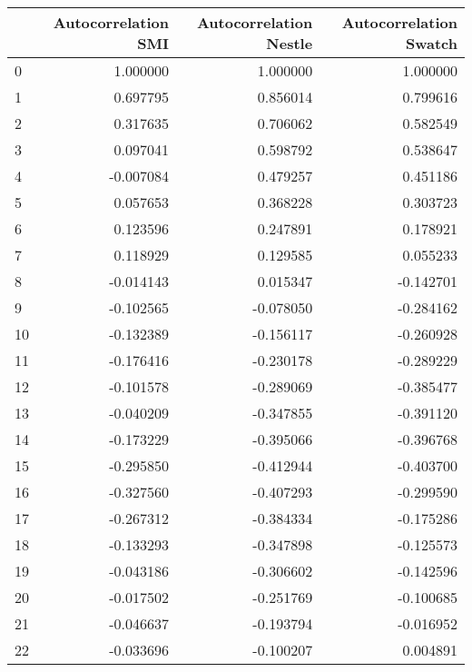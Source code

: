 \begin{tabular}{lrrr}
\toprule
{} &  Autocorrelation SMI &  Autocorrelation Nestle &  Autocorrelation Swatch \\
\midrule
0  &             1.000000 &                1.000000 &                1.000000 \\
1  &             0.697795 &                0.856014 &                0.799616 \\
2  &             0.317635 &                0.706062 &                0.582549 \\
3  &             0.097041 &                0.598792 &                0.538647 \\
4  &            -0.007084 &                0.479257 &                0.451186 \\
5  &             0.057653 &                0.368228 &                0.303723 \\
6  &             0.123596 &                0.247891 &                0.178921 \\
7  &             0.118929 &                0.129585 &                0.055233 \\
8  &            -0.014143 &                0.015347 &               -0.142701 \\
9  &            -0.102565 &               -0.078050 &               -0.284162 \\
10 &            -0.132389 &               -0.156117 &               -0.260928 \\
11 &            -0.176416 &               -0.230178 &               -0.289229 \\
12 &            -0.101578 &               -0.289069 &               -0.385477 \\
13 &            -0.040209 &               -0.347855 &               -0.391120 \\
14 &            -0.173229 &               -0.395066 &               -0.396768 \\
15 &            -0.295850 &               -0.412944 &               -0.403700 \\
16 &            -0.327560 &               -0.407293 &               -0.299590 \\
17 &            -0.267312 &               -0.384334 &               -0.175286 \\
18 &            -0.133293 &               -0.347898 &               -0.125573 \\
19 &            -0.043186 &               -0.306602 &               -0.142596 \\
20 &            -0.017502 &               -0.251769 &               -0.100685 \\
21 &            -0.046637 &               -0.193794 &               -0.016952 \\
22 &            -0.033696 &               -0.100207 &                0.004891 \\
\bottomrule
\end{tabular}
